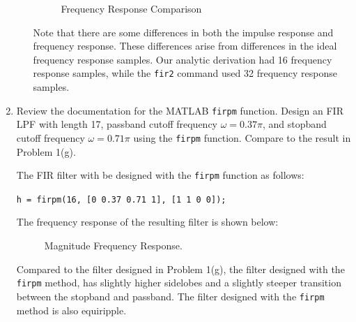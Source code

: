 \documentclass[fleqn]{article}
\begin{document}
\begin{enumerate}
\begin{enumerate}[nolistsep]
			\begin{figure}[H]
				\centerline{}
				\caption{Frequency Response Comparison}
			\end{figure}
			
			Note that there are some differences in both the impulse response and frequency response. These differences arise from differences in the ideal frequency response samples. Our analytic derivation had 16 frequency response samples, while the \texttt{fir2} command used 32 frequency response samples.
		\end{enumerate}
		
		\item Review the documentation for the MATLAB 
		\texttt{firpm} function. Design an FIR LPF with length 17, passband cutoff frequency $\omega = 0.37\pi$, and stopband cutoff frequency $\omega = 0.71\pi$ using the \texttt{firpm} function. Compare to the result in Problem 1(g).
		
		\pagebreak
		The FIR filter with be designed with the \texttt{firpm} function as follows:
		
		\texttt{h = firpm(16, [0 0.37 0.71 1], [1 1 0 0]);}
		
		The frequency response of the resulting filter is shown below:
		
		\begin{figure}[H]
			\centerline{}
			\caption{Magnitude Frequency Response.}
		\end{figure}
		
		Compared to the filter designed in Problem 1(g), the filter designed with the \texttt{firpm} method, has slightly higher sidelobes and a slightly steeper transition between the stopband and passband. The filter designed with the \texttt{firpm} method is also equiripple.
	\end{enumerate}	
\end{document}
